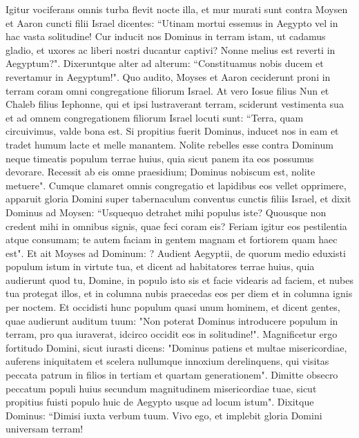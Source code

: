 \begin{biblechapter}  
\verse Igitur vociferans omnis turba flevit nocte illa, 
\verse et mur murati sunt contra Moysen et Aaron cuncti filii Israel dicentes: “Utinam mortui essemus in Aegypto vel in hac vasta solitudine! 
\verse Cur inducit nos Dominus in terram istam, ut cadamus gladio, et uxores ac liberi nostri ducantur captivi? Nonne melius est reverti in Aegyptum?". 
\verse Dixeruntque alter ad alterum: “Constituamus nobis ducem et revertamur in Aegyptum!". 
\verse Quo audito, Moyses et Aaron ceciderunt proni in terram coram omni congregatione filiorum Israel. 
\verse At vero Iosue filius Nun et Chaleb filius Iephonne, qui et ipsi lustraverant terram, sciderunt vestimenta sua 
\verse et ad omnem congregationem filiorum Israel locuti sunt: “Terra, quam circuivimus, valde bona est. 
\verse Si propitius fuerit Dominus, inducet nos in eam et tradet humum lacte et melle manantem. 
\verse Nolite rebelles esse contra Dominum neque timeatis populum terrae huius, quia sicut panem ita eos possumus devorare. Recessit ab eis omne praesidium; Dominus nobiscum est, nolite metuere". 
\verse Cumque clamaret omnis congregatio et lapidibus eos vellet opprimere, apparuit gloria Domini super tabernaculum conventus cunctis filiis Israel, 
\verse et dixit Dominus ad Moysen: “Usquequo detrahet mihi populus iste? Quousque non credent mihi in omnibus signis, quae feci coram eis? 
\verse Feriam igitur eos pestilentia atque consumam; te autem faciam in gentem magnam et fortiorem quam haec est". 
\verse Et ait Moyses ad Dominum: ? Audient Aegyptii, de quorum medio eduxisti populum istum in virtute tua, 
\verse et dicent ad habitatores terrae huius, quia audierunt quod tu, Domine, in populo isto sis et facie videaris ad faciem, et nubes tua protegat illos, et in columna nubis praecedas eos per diem et in columna ignis per noctem. 
\verse Et occidisti hunc populum quasi unum hominem, et dicent gentes, quae audierunt auditum tuum: 
\verse "Non poterat Dominus introducere populum in terram, pro qua iuraverat, idcirco occidit eos in solitudine!". 
\verse Magnificetur ergo fortitudo Domini, sicut iurasti dicens: 
\verse "Dominus patiens et multae misericordiae, auferens iniquitatem et scelera nullumque innoxium derelinquens, qui visitas peccata patrum in filios in tertiam et quartam generationem". 
\verse Dimitte obsecro peccatum populi huius secundum magnitudinem misericordiae tuae, sicut propitius fuisti populo huic de Aegypto usque ad locum istum". 
\verse Dixitque Dominus: “Dimisi iuxta verbum tuum. 
\verse Vivo ego, et implebit gloria Domini universam terram! 

\end{biblechapter}
